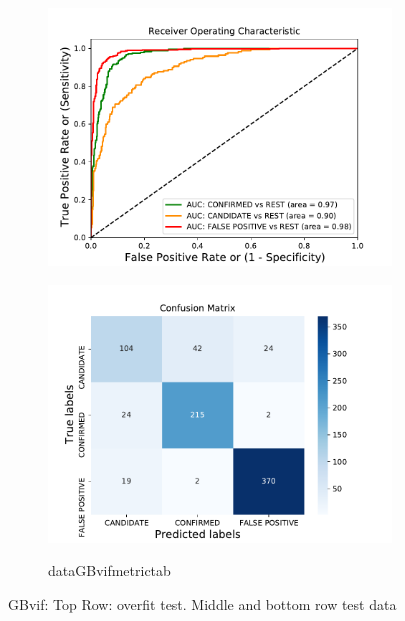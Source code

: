 \begin{figure}[H]
\begin{mdframed}[linecolor=green]
\begin{subfigure}{.49\textwidth}
                \includegraphics[width = 1\textwidth]{data/GB_vif_roc.pdf}
                \end{subfigure}
                \begin{subfigure}{.49\textwidth}
                \includegraphics[width = 1\textwidth]{data/GB_vif_cm.pdf}
                \end{subfigure}
                \begin{subfigure}{1\textwidth}
                \csname dataGBvifmetrictab\endcsname
                \end{subfigure}
                \caption{GBvif: Top Row: overfit test. Middle and bottom row test data}
                \label{fig:data/GB_vif_roc}
                \end{mdframed}
                \end{figure}